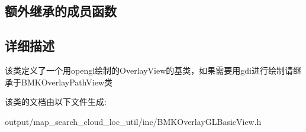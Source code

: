 \subsection*{额外继承的成员函数}


\subsection{详细描述}
该类定义了一个用opengl绘制的\+Overlay\+View的基类，如果需要用gdi进行绘制请继承于\+B\+M\+K\+Overlay\+Path\+View类 

该类的文档由以下文件生成\+:\begin{DoxyCompactItemize}
\item 
output/map\+\_\+search\+\_\+cloud\+\_\+loc\+\_\+util/inc/B\+M\+K\+Overlay\+G\+L\+Basic\+View.\+h\end{DoxyCompactItemize}
